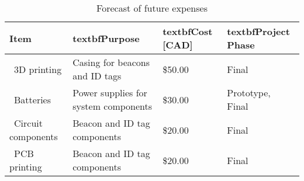 \begin{table}[H]
\centering
\begin{tabular}{ | m{3cm} | m{6.5cm} |m{3cm}|m{3cm}}
\hline
\textbf{Item} & textbf{Purpose} & textbf{Cost [CAD]} & textbf{Project Phase}  \\
\hline
\ 3D printing & Casing for beacons and ID tags & \$50.00 & Final  \\
\hline
\ Batteries & Power supplies for system components & \$30.00 & Prototype, Final \\
\hline
\ Circuit components & Beacon and ID tag components & \$20.00 & Final \\
\hline
\ PCB printing & Beacon and ID tag components & \$20.00 & Final \\
\hline
\end{tabular}
\caption{Forecast of future expenses}
\end{table}

